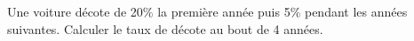 
Une voiture décote de 20\% la première année puis 5\% pendant les années suivantes. Calculer le taux de décote au bout de 4 années. 